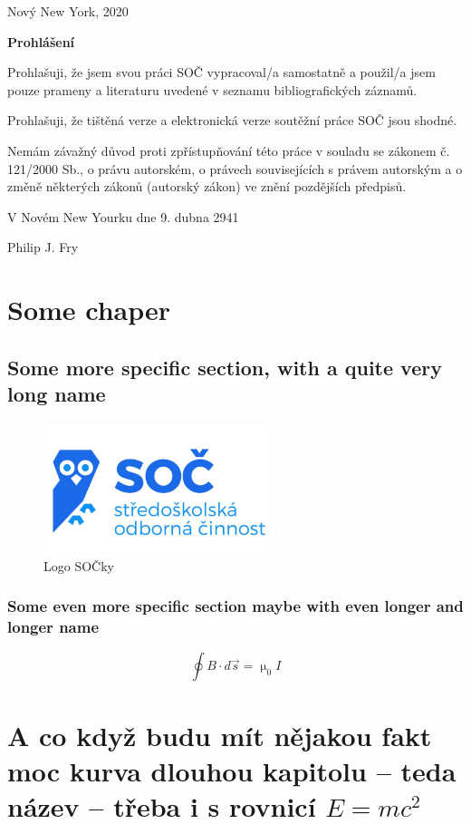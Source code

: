 \documentclass[12pt, a4paper,
 twoside,        %
 openright
]{report}
\begin{document}
\noindent Nový New York, 2020

\cleardoublepage

{\Large{\bfseries{Prohlášení}}} %

\noindent Prohlašuji, že jsem svou práci SOČ vypracoval/a samostatně a použil/a jsem pouze prameny a literaturu uvedené v seznamu bibliografických záznamů.

\noindent Prohlašuji, že tištěná verze a elektronická verze soutěžní práce SOČ jsou shodné. 

\noindent Nemám závažný důvod proti zpřístupňování této práce v souladu se zákonem č. 121/2000 Sb., o právu autorském, o právech souvisejících s právem autorským a o změně některých zákonů (autorský zákon) ve znění pozdějších předpisů. 

\vspace{12 pt}

\noindent V Novém New Yourku dne 9. dubna 2941 \dotfill{} 

\hspace{8cm} Philip J. Fry


\tableofcontents

\chapter{Some chaper}
\lipsum[1-2]

\section[Třeba taky udělám zkratku]{Some more specific section, with a quite very long name}
\lipsum[1-2]

\begin{figure}[h]
    \centering
    \includegraphics[width=0.6\textwidth]{imgs/soc-logo.jpg}
    \caption{Logo SOČky}
    \label{fig:logoSOC}
\end{figure}

\subsection{Some even more specific section maybe with even longer and longer name}
\lipsum[1-2]
\begin{equation}
    \oint B \cdot d \vec{s} = \upmu_0 I
\end{equation}
\lipsum[1-3]

\chapter[Třeba to ale nějak zkrátím]{A co když budu mít nějakou fakt moc kurva dlouhou kapitolu -- teda název -- třeba i s rovnicí $E = mc^2$}
\end{document}
